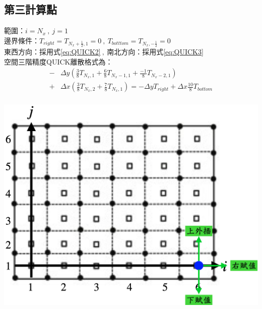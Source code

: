 \documentclass[12pt]{article}
\begin{document}
\subsection{第三計算點}
 \begin{minipage}{0.6\textwidth}
   \noindent 範圍：$i=N_{x}\ ,\ j=1$\\[1.5ex]
   \noindent 邊界條件：$T_{right} = T_{N_{x}+\frac{1}{2},1}= 0\ ,\ T_{botttom} = T_{N_{x},-\frac{1}{2}}= 0$\\[1.5ex]
   \noindent 東西方向：採用式\eqref{eq:QUICK2}$\ ,\ $南北方向：採用式\eqref{eq:QUICK3}\\[1.5ex]
   \noindent 空間三階精度QUICK離散格式為：
   \begin{equation*}\begin{split}
   -&\Delta y(\frac{3}{8}T_{N_{x},1} + \frac{6}{8}T_{N_{x}-1,1} + \frac{-1}{8}T_{N_{x}-2,1}) \\[1.5ex] 
   +&\Delta x (\frac{3}{8}T_{N_{x},2} + \frac{7}{8}T_{N_{x},1} ) = -\Delta y T_{right} + \Delta x\frac{10}{8}T_{bottom} \\[1.5ex]
   \end{split}\end{equation*}
   \end{minipage}%
   \hfill
   \begin{minipage}{0.34\textwidth}
   \centering
   \includegraphics[width=\linewidth,height=9\baselineskip]{22.png}
   \label{fig:3rd point}
\end{minipage}
\end{document}
